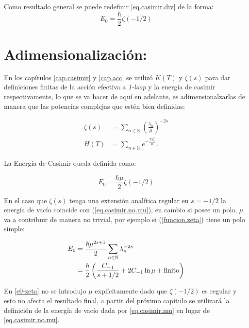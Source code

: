 \bigskip

Como resultado general se puede redefinir \ref{eq.casimir.div} de la forma:
\begin{equation}
E _0 = \frac{\hbar}{2} \zeta  (-1/2)
\label{eq.casimir.no.mu}
\end{equation}

\bigskip

\section{Adimensionalización:}

\medskip

En los capítulos \ref{cap.casimir} y \ref{cap.acc} se utilizó $K(T)$ y $\zeta (s)$ para dar definiciones finitas de la acción efectiva a {\it 1-loop} y la energía de casimir respectivamente, lo que se va hacer de aquí en adelante, es adimensionalzarlas de manera que las potencias complejas que estén bien definidas:

\begin{align}
\zeta  (s) &= \sum\limits_{n \in \mathbb N} \left( \frac{\lambda  _n}{\mu }  \right) ^{-2s } \label{def.adim}\\[10pt]
H \left( T \right)  &= \sum\limits_{n \in \mathbb N} e ^{- \frac{T \lambda ^2 _{n}}{\mu} } \, .
\end{align}

La Energía de Casimir queda definida como:

\begin{equation}
E _0 = \frac{\hbar \mu}{2} \zeta  (-1/2)
\label{eq.casimir.mu}
\end{equation}

En el caso que $\zeta (s)$ tenga una extensión analítica regular en $s=-1/2$ la energía de vacío coincide con (\ref{eq.casimir.no.mu}), en cambio si posee un polo, $\mu$ va a contribuir de manera no trivial, por ejemplo si (\ref{funcion.zeta}) tiene un polo simple:

\begin{equation}
\begin{aligned}
E _0 &= 
\frac{\hbar \mu ^{2s+1}}{2} 
\sum\limits_{n \in \mathbb N}  \lambda _n   ^{-2s } \\ &= 
\frac{\hbar }{2} 
\left(
		\frac{C _{-1}}{  s+1/2 } + 2 C _{-1} \ln \mu + {\rm finito} 
		\right) 
\end{aligned}
\end{equation}

En \ref{e0-zeta} no se introdujo $\mu$ explícitamente dado que $\zeta (-1/2)$ es regular y esto no afecta el resultado final, a partir del próximo capítulo se utilizará la definición de la energía de vacío dada por \ref{eq.casimir.mu} en lugar de \ref{eq.casimir.no.mu}.
